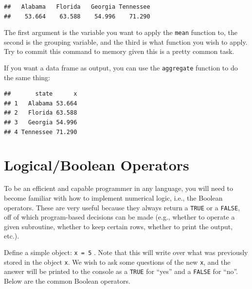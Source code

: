 \documentclass[]{book}
\newenvironment{Shaded}{\begin{snugshade}}{\end{snugshade}}
\newcommand{\KeywordTok}[1]{\textcolor[rgb]{0.13,0.29,0.53}{\textbf{#1}}}
\newcommand{\DataTypeTok}[1]{\textcolor[rgb]{0.13,0.29,0.53}{#1}}
\newcommand{\OperatorTok}[1]{\textcolor[rgb]{0.81,0.36,0.00}{\textbf{#1}}}
\newcommand{\NormalTok}[1]{#1}
\theoremstyle{definition}
\theoremstyle{definition}
\theoremstyle{definition}
\theoremstyle{remark}
\begin{document}
\begin{Shaded}
\end{Shaded}

\begin{verbatim}
##   Alabama   Florida   Georgia Tennessee 
##    53.664    63.588    54.996    71.290
\end{verbatim}

The first argument is the variable you want to apply the \texttt{mean}
function to, the second is the grouping variable, and the third is what
function you wish to apply. Try to commit this command to memory given
this is a pretty common task.

If you want a data frame as output, you can use the \texttt{aggregate}
function to do the same thing:

\begin{Shaded}
\end{Shaded}

\begin{verbatim}
##       state      x
## 1   Alabama 53.664
## 2   Florida 63.588
## 3   Georgia 54.996
## 4 Tennessee 71.290
\end{verbatim}

\section{Logical/Boolean Operators}\label{logicalboolean-operators}

To be an efficient and capable programmer in any language, you will need
to become familiar with how to implement numerical logic, i.e., the
Boolean operators. These are very useful because they always return a
\texttt{TRUE} or a \texttt{FALSE}, off of which program-based decisions
can be made (e.g., whether to operate a given subroutine, whether to
keep certain rows, whether to print the output, etc.).

Define a simple object: \texttt{x\ =\ 5} . Note that this will write
over what was previously stored in the object \texttt{x}. We wish to ask
some questions of the new \texttt{x}, and the answer will be printed to
the console as a \texttt{TRUE} for ``yes'' and a \texttt{FALSE} for
``no''. Below are the common Boolean operators.
\end{document}
